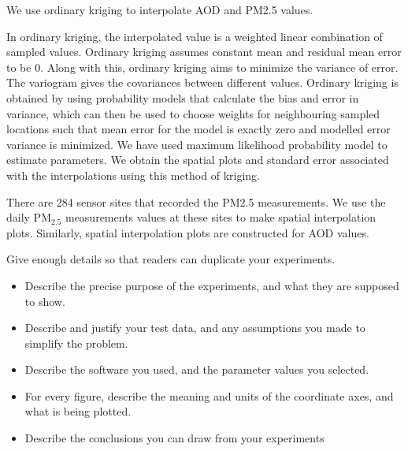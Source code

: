 \documentclass[10pt]{article}
\begin{document}
We use ordinary kriging to interpolate AOD and PM2.5 values.

In ordinary kriging, the interpolated value is a weighted linear combination of sampled values. Ordinary kriging assumes constant mean and  residual mean error to be 0. Along with this, ordinary kriging aims to minimize the variance of error. The variogram gives the covariances between different values. Ordinary kriging is obtained by using probability models that calculate the bias and error in variance, which can then be used to choose weights for neighbouring sampled locations such that mean error for the model is exactly zero and modelled error variance is minimized. We have used maximum likelihood probability model to estimate parameters. We obtain the spatial plots and standard error associated with  the interpolations using this method of kriging. 

There are 284 sensor sites that recorded the PM2.5 measurements. We use the daily  PM$_{2.5}$ measurements values at these sites to make spatial interpolation plots. Similarly, spatial interpolation plots are constructed for AOD values. 


Give enough details so that readers can duplicate your experiments.

\begin{itemize}
\item Describe the precise purpose of the experiments, and what they 
are supposed to show.

\item Describe and justify your test data, and any assumptions you made to 
simplify the problem.

\item Describe the software you used, and the 
parameter values you selected.

\item 
For every figure, describe the meaning and units of the coordinate axes, 
and what is being plotted.

\item Describe the conclusions you can draw from your experiments
\end{itemize}
\end{document}
